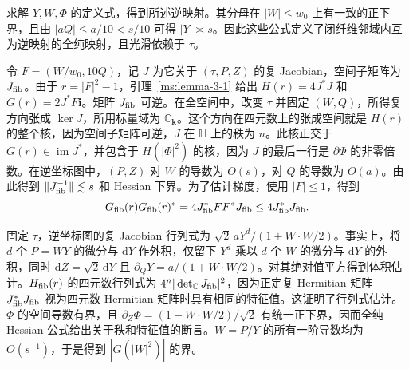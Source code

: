 求解 $Y,W,\Phi$ 的定义式，得到所述逆映射。其分母在 $|W|\le w_0$ 上有一致的正下界，且由 $|aQ|\le a/10<s/10$ 可得 $|Y|\asymp s$。因此这些公式定义了闭纤维邻域内互为逆映射的全纯映射，且光滑依赖于 $\tau$。

令 $F=(W/w_0,10Q)$，记 $J$ 为它关于 $(\tau,P,Z)$ 的复 Jacobian，空间子矩阵为 $J_{\rm fib}$。由于 $r=|F|^2-1$，引理~\ref{ms:lemma-3-1} 给出 $H(r)=4J^*J$ 和 $G(r)=2J^*F\mathbf i$。矩阵 $J_{\rm fib}$ 可逆。在全空间中，改变 $\tau$ 并固定 $(W,Q)$，所得复方向张成 $\ker J$，所用标量域为 $\mathbb C_{\mathbf k}$。这个方向在四元数上的张成空间就是 $H(r)$ 的整个核，因为空间子矩阵可逆，$J$ 在 $\mathbb H$ 上的秩为 $n$。此核正交于 $G(r)\in\operatorname{im}J^*$，并包含于 $H(|\Phi|^2)$ 的核，因为 $J$ 的最后一行是 $\partial\Phi$ 的非零倍数。在逆坐标图中，$(P,Z)$ 对 $W$ 的导数为 $O(s)$，对 $Q$ 的导数为 $O(a)$。由此得到 $\|J_{\rm fib}^{-1}\|\lesssim s$ 和 Hessian 下界。为了估计梯度，使用 $|F|\le1$，得到
\[
  G_{\rm fib}(r)G_{\rm fib}(r)^*=4J_{\rm fib}^*FF^*J_{\rm fib}
     \le4J_{\rm fib}^*J_{\rm fib}.
\]

固定 $\tau$，逆坐标图的复 Jacobian 行列式为 $\sqrt 2\,aY^d/(1+W\cdot W/2)$。事实上，将 $d$ 个 $P=WY$ 的微分与 $\mathrm dY$ 作外积，仅留下 $Y^d$ 乘以 $d$ 个 $W$ 的微分与 $\mathrm dY$ 的外积，同时 $\mathrm dZ=\sqrt 2\,\mathrm dY$ 且 $\partial_Q Y=a/(1+W\cdot W/2)$。对其绝对值平方得到体积估计。$H_{\rm fib}(r)$ 的四元数行列式为 $4^n|\det_{\mathbb C}J_{\rm fib}|^2$，因为正定复 Hermitian 矩阵 $J_{\rm fib}^*J_{\rm fib}$ 视为四元数 Hermitian 矩阵时具有相同的特征值。这证明了行列式估计。$\Phi$ 的空间导数有界，且 $\partial_Z\Phi=(1-W\cdot W/2)/\sqrt2$ 有统一正下界，因而全纯 Hessian 公式给出关于秩和特征值的断言。$W=P/Y$ 的所有一阶导数均为 $O(s^{-1})$，于是得到 $|G(|W|^2)|$ 的界。
